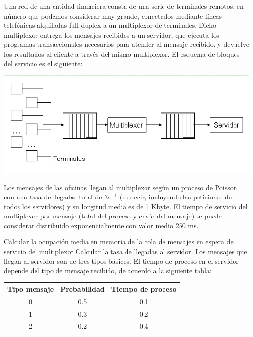 
\begin{problem}[8]\label{tema2:prob8}
Una red de una entidad financiera consta de una serie de terminales remotos, en número que podemos considerar muy grande, conectados mediante líneas telefónicas alquiladas full duplex a un multiplexor de terminales. Dicho multiplexor entrega los mensajes recibidos a un servidor, que ejecuta los programas transaccionales necesarios para atender al mensaje recibido, y devuelve los resultados al cliente a través del mismo multiplexor. El esquema de bloques del servicio es el siguiente:

\begin{center}
  \includegraphics[keepaspectratio=true,width=\linewidth]{img/ej8.png}
\end{center}

Los mensajes de las oficinas llegan al multiplexor según un proceso de Poisson con una tasa de llegadas total de 3$s^{-1}$ (es decir, incluyendo las peticiones de todos los servidores) y su longitud media es de 1 Kbyte. El tiempo de servicio del multiplexor por mensaje (total del proceso y envío del mensaje) se puede considerar distribuido exponencialmente con valor medio 250 ms.

\ppart Calcular la ocupación media en memoria de la cola de mensajes en espera de servicio del multiplexor
\ppart Calcular la tasa de llegadas al servidor.
\ppart Los mensajes que llegan al servidor son de tres tipos básicos. El tiempo de proceso en el servidor depende del tipo de mensaje recibido, de acuerdo a la siguiente tabla:

\begin{center}
\begin{tabular}{| c | c | c |}
\hline
  \textbf{Tipo mensaje} &  \textbf{Probabilidad} & \textbf{Tiempo de proceso}\\
\hline
0 & 0.5 & 0.1 \\
1 & 0.3 & 0.2 \\
2 & 0.2 & 0.4 \\
\hline
\end{tabular}
\end{center}


\end{problem}
